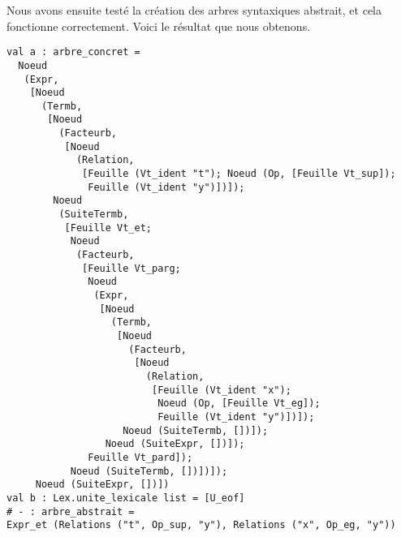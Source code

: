 \documentclass[11pt]{article} %
\begin{document}
Nous avons ensuite testé la création des arbres syntaxiques abstrait, et cela fonctionne correctement. Voici le résultat que nous obtenons.
\begin{lstlisting}
val a : arbre_concret =
  Noeud
   (Expr,
    [Noeud
      (Termb,
       [Noeud
         (Facteurb,
          [Noeud
            (Relation,
             [Feuille (Vt_ident "t"); Noeud (Op, [Feuille Vt_sup]);
              Feuille (Vt_ident "y")])]);
        Noeud
         (SuiteTermb,
          [Feuille Vt_et;
           Noeud
            (Facteurb,
             [Feuille Vt_parg;
              Noeud
               (Expr,
                [Noeud
                  (Termb,
                   [Noeud
                     (Facteurb,
                      [Noeud
                        (Relation,
                         [Feuille (Vt_ident "x");
                          Noeud (Op, [Feuille Vt_eg]);
                          Feuille (Vt_ident "y")])]);
                    Noeud (SuiteTermb, [])]);
                 Noeud (SuiteExpr, [])]);
              Feuille Vt_pard]);
           Noeud (SuiteTermb, [])])]);
     Noeud (SuiteExpr, [])])
val b : Lex.unite_lexicale list = [U_eof]
# - : arbre_abstrait =
Expr_et (Relations ("t", Op_sup, "y"), Relations ("x", Op_eg, "y"))
\end{lstlisting}
\end{document}
